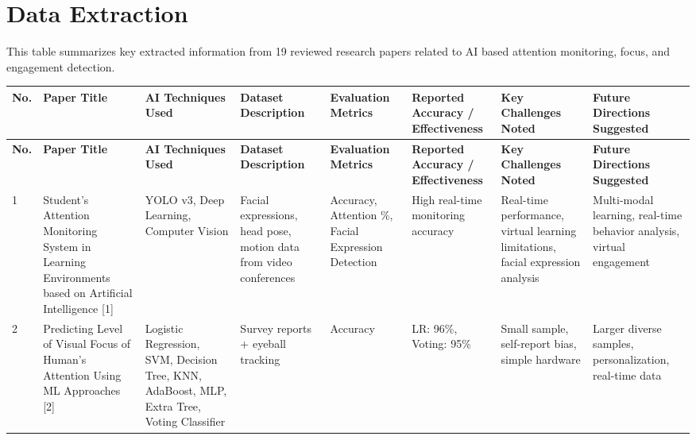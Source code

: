 \documentclass[twocolumn,12pt]{article}
\newcommand{\tablecell}[1]{\raggedright\footnotesize #1}
\begin{document}
\section{Data Extraction}
This table summarizes key extracted information from 19 reviewed research papers related to AI based attention monitoring, focus, and engagement detection.


{\scriptsize %
\setlength{\tabcolsep}{3pt}       %
\renewcommand{\arraystretch}{0.85} %

\begin{longtable}{|p{}|p{}|p{}|p{}|p{}|p{}|p{}|p{}|}
\hline
\textbf{No.} & \tablecell{\textbf{Paper Title}} & \tablecell{\textbf{AI Techniques Used}} & \tablecell{\textbf{Dataset Description}} & \tablecell{\textbf{Evaluation Metrics}} & \tablecell{\textbf{Reported Accuracy / Effectiveness}} & \tablecell{\textbf{Key Challenges Noted}} & \tablecell{\textbf{Future Directions Suggested}} \\
\hline
\endfirsthead
\hline
\textbf{No.} & \tablecell{\textbf{Paper Title}} & \tablecell{\textbf{AI Techniques Used}} & \tablecell{\textbf{Dataset Description}} & \tablecell{\textbf{Evaluation Metrics}} & \tablecell{\textbf{Reported Accuracy / Effectiveness}} & \tablecell{\textbf{Key Challenges Noted}} & \tablecell{\textbf{Future Directions Suggested}} \\
\hline
\endhead
1 & \tablecell{Student’s Attention Monitoring System in Learning Environments based on Artificial Intelligence [1]} & \tablecell{YOLO v3, Deep Learning, Computer Vision} & \tablecell{Facial expressions, head pose, motion data from video conferences} & \tablecell{Accuracy, Attention \%, Facial Expression Detection} & \tablecell{High real-time monitoring accuracy} & \tablecell{Real-time performance, virtual learning limitations, facial expression analysis} & \tablecell{Multi-modal learning, real-time behavior analysis, virtual engagement} \\
\hline
2 & \tablecell{Predicting Level of Visual Focus of Human’s Attention Using ML Approaches [2]} & \tablecell{Logistic Regression, SVM, Decision Tree, KNN, AdaBoost, MLP, Extra Tree, Voting Classifier} & \tablecell{Survey reports + eyeball tracking} & \tablecell{Accuracy} & \tablecell{LR: 96\%, Voting: 95\%} & \tablecell{Small sample, self-report bias, simple hardware} & \tablecell{Larger diverse samples, personalization, real-time data} \\

\end{longtable}}
\end{document}
